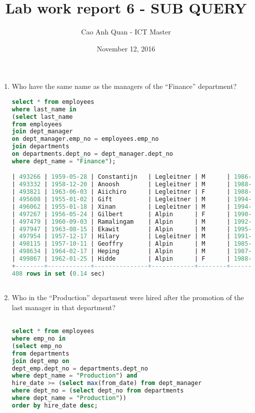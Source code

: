 \documentclass[12pt]{article}
\title{Lab work report 6 - SUB QUERY}
\author{Cao Anh Quan - ICT Master}
\date{November 12, 2016}
\begin{document}
 
\begin{titlepage}
\maketitle
\end{titlepage}

\begin{enumerate}



\item Who have the same name as the managers of the “Finance” department?
\begin{lstlisting}[language=SQL]
select * from employees 
where last_name in 
(select last_name
from employees 
join dept_manager
on dept_manager.emp_no = employees.emp_no
join departments 
on departments.dept_no = dept_manager.dept_no
where dept_name = "Finance");

| 493266 | 1959-05-28 | Constantijn   | Legleitner | M      | 1986-05-25 |
| 493332 | 1958-12-20 | Anoosh        | Legleitner | M      | 1988-11-10 |
| 493821 | 1963-06-03 | Aiichiro      | Legleitner | F      | 1988-04-07 |
| 495608 | 1955-01-02 | Gift          | Legleitner | M      | 1994-04-28 |
| 496062 | 1955-01-18 | Xinan         | Legleitner | M      | 1994-05-02 |
| 497267 | 1956-05-24 | Gilbert       | Alpin      | F      | 1990-07-21 |
| 497479 | 1960-09-03 | Ramalingam    | Alpin      | M      | 1992-05-03 |
| 497947 | 1963-08-15 | Ekawit        | Alpin      | M      | 1995-06-29 |
| 497954 | 1957-12-17 | Hilary        | Legleitner | M      | 1991-08-07 |
| 498115 | 1957-10-11 | Geoffry       | Alpin      | M      | 1985-10-01 |
| 498634 | 1964-02-17 | Heping        | Alpin      | M      | 1987-12-14 |
| 499867 | 1962-01-25 | Hidde         | Alpin      | F      | 1988-10-13 |
+--------+------------+---------------+------------+--------+------------+
408 rows in set (0.14 sec)



\end{lstlisting}

\item Who in the “Production” department were hired after the promotion of the last
 manager in that department?
 \begin{lstlisting}[language=SQL]

select * from employees 
where emp_no in 
(select emp_no 
from departments
join dept_emp on
dept_emp.dept_no = departments.dept_no
where dept_name = "Production") and
hire_date >= (select max(from_date) from dept_manager
where dept_no = (select dept_no from departments
where dept_name = "Production"))
order by hire_date desc;


\end{lstlisting}
\end{enumerate}
\end{document}
